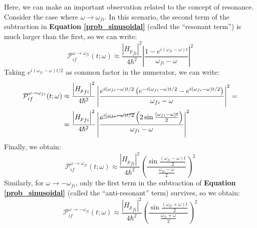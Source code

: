 Here, we can make an important observation related to the concept of resonance. Consider the case where $\omega \to \omega_{fi}$. In this scenario, the second term of the subtraction in \textbf{Equation \ref{prob_sinusoidal}} (called the ``resonant term'') is much larger than the first, so we can write:
\begin{equation}
    \mathcal{P}_{if}^{\omega\to\omega_{fi}}(t;\omega) \approx \frac{\left|{H_p}_{fi}\right|^2}{4\hbar^2}\left|\frac{1-e^{i(\omega_{fi} - \omega) t}}{\omega_{fi} - \omega} \right|^2
\end{equation}
Taking $e^{i(\omega_{fi}-\omega)t/2}$ as common factor in the numerator, we can write:
\begin{equation}
    \begin{split}
        \mathcal{P}_{if}^{\omega\to\omega_{fi}}(t;\omega) &\approx \frac{\left|{H_p}_{fi}\right|^2}{4\hbar^2}\left|\frac{e^{i(\omega_{fi}-\omega)t/2}\left(e^{-i(\omega_{fi}-\omega)t/2}-e^{i(\omega_{fi} - \omega) t/2}\right)}{\omega_{fi} - \omega} \right|^2 =\\
        &= \frac{\left|{H_p}_{fi}\right|^2}{4\hbar^2}\left|\frac{\cancel{e^{i(\omega_{fi}-\omega)t/2}}\left( 2\sin\frac{(\omega_{fi}-\omega)t}{2} \right)}{\omega_{fi} - \omega} \right|^2
    \end{split}
\end{equation}
Finally, we obtain:
\begin{equation}
    \mathcal{P}_{if}^{\omega\to\omega_{fi}}(t;\omega) \approx \frac{\left|{H_p}_{fi}\right|^2}{4\hbar^2}\left(\frac{\sin\frac{(\omega_{fi}-\omega)t}{2}}{\frac{\omega_{fi} - \omega}{2}} \right)^2
\end{equation}
Similarly, for $\omega \to - \omega_{fi}$, only the first term in the subtraction of \textbf{Equation \ref{prob_sinusoidal}} (called the ``anti-resonant'' term) survives, so we obtain:
\begin{equation}
    \mathcal{P}_{if}^{\omega\to-\omega_{fi}}(t;\omega) \approx \frac{\left|{H_p}_{fi}\right|^2}{4\hbar^2}\left(\frac{\sin\frac{(\omega_{fi}+\omega)t}{2}}{\frac{\omega_{fi} + \omega}{2}} \right)^2
\end{equation}


